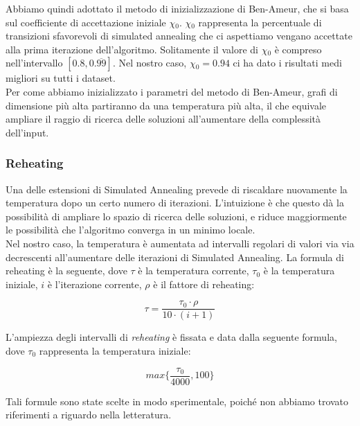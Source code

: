 \noindent Abbiamo quindi adottato il metodo di inizializzazione di Ben-Ameur, che si basa sul coefficiente di accettazione iniziale $\chi{}_0$. $\chi{}_0$ rappresenta la percentuale di transizioni sfavorevoli di simulated annealing che ci aspettiamo vengano accettate alla prima iterazione dell'algoritmo. Solitamente il valore di $\chi{}_0$ è compreso nell'intervallo $[0.8, 0.\overline{99}]$. Nel nostro caso, $\chi{}_0 = 0.94$ ci ha dato i risultati medi migliori su tutti i dataset. \\

\noindent Per come abbiamo inizializzato i parametri del metodo di Ben-Ameur, grafi di dimensione più alta partiranno da una temperatura più alta, il che equivale ampliare il raggio di ricerca delle soluzioni all'aumentare della complessità dell'input.

\subsubsection{Reheating}

Una delle estensioni di Simulated Annealing prevede di riscaldare nuovamente la temperatura dopo un certo numero di iterazioni. L'intuizione è che questo dà la possibilità di ampliare lo spazio di ricerca delle soluzioni, e riduce maggiormente le possibilità che l'algoritmo converga in un minimo locale. \\

\noindent Nel nostro caso, la temperatura è aumentata ad intervalli regolari di valori via via decrescenti all'aumentare delle iterazioni di Simulated Annealing. La formula di reheating è la seguente, dove $\tau{}$ è la temperatura corrente, $\tau{}_0$ è la temperatura iniziale, $i$ è l'iterazione corrente, $\rho$ è il fattore di reheating:

\begin{equation}
    \tau{} = \frac{\tau{}_0 \cdot \rho{}}{10 \cdot (i + 1)} 
\end{equation}

L'ampiezza degli intervalli di \textit{reheating} è fissata e data dalla seguente formula, dove $\tau{}_0$ rappresenta la temperatura iniziale:

\begin{equation}
    max\{ \frac{\tau{}_0}{4000}, 100 \}
\end{equation}

\noindent Tali formule sono state scelte in modo sperimentale, poiché non abbiamo trovato riferimenti a riguardo nella letteratura.

